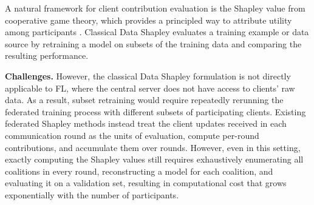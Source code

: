 \documentclass[letterpaper]{article} %
\theoremstyle{definition} %
\begin{document}


A natural framework for client contribution evaluation is the Shapley value from cooperative game theory, which provides a principled way to attribute utility among participants \citep{shapley1953value,ghorbani2019data}. 
Classical Data Shapley evaluates a training example or data source by
retraining a model on subsets of the training data and comparing the resulting
performance. 



\noindent\textbf{Challenges.}
However, the classical Data Shapley formulation is not directly applicable to FL,
where the central server does not have access to clients' raw data. As a result,
subset retraining would require repeatedly rerunning the federated training
process with different subsets of participating clients. Existing federated
Shapley methods instead treat the client updates received in each communication
round as the units of evaluation, compute per-round contributions, and
accumulate them over rounds. However, even in this setting, exactly
computing the Shapley values still requires exhaustively enumerating all coalitions in every
round, reconstructing a model for each coalition, and evaluating it on a
validation set, resulting in computational cost that grows exponentially with
the number of participants.



\end{document}
